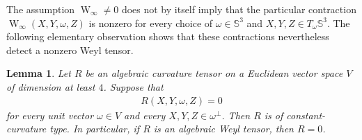 \documentclass[10pt]{amsart}
\newcommand{\Sph}{\mathbb{S}}
\newcommand{\Weyl}{\operatorname{W}}
\theoremstyle{plain}
\newtheorem{lemma}[theorem]{Lemma}
\theoremstyle{remark}
\begin{document}
	The assumption $\Weyl_\infty\neq0$ does not by itself imply that the
	particular contraction
	$\Weyl_\infty(X,Y,\omega,Z)$ is nonzero for every choice of
	$\omega\in\Sph^3$ and $X,Y,Z\in T_\omega\Sph^3$. The following elementary observation shows that these contractions nevertheless detect a nonzero Weyl tensor.
	
	\begin{lemma}\label{lem:BY-radial-Weyl-detection}
		Let $R$ be an algebraic curvature tensor on a Euclidean vector space
		$V$ of dimension at least $4$. Suppose that
		\begin{align*}
			R(X,Y,\omega,Z)=0
		\end{align*}
		for every unit vector $\omega\in V$ and every
		$X,Y,Z\in\omega^\perp$. Then $R$ is of constant-curvature type. In
		particular, if $R$ is an algebraic Weyl tensor, then $R=0$.
	\end{lemma}
	
\end{document}

